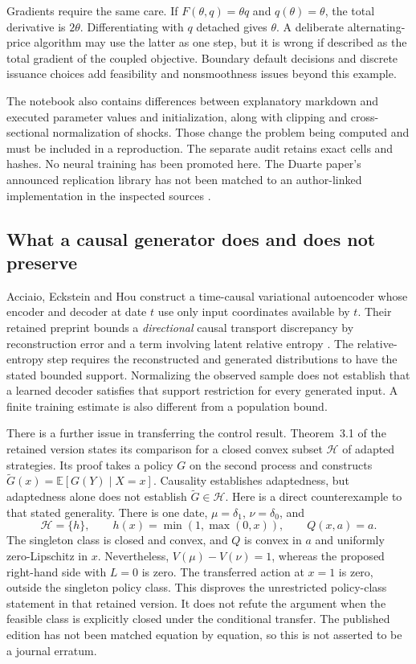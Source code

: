 \documentclass[11pt,a4paper]{article}
\newcommand{\E}{\mathbb E}
\begin{document}
Gradients require the same care. If $F(\theta,q)=\theta q$ and
$q(\theta)=\theta$, the total derivative is $2\theta$. Differentiating
with $q$ detached gives $\theta$. A deliberate alternating-price algorithm
may use the latter as one step, but it is wrong if described as the total
gradient of the coupled objective. Boundary default decisions and discrete
issuance choices add feasibility and nonsmoothness issues beyond this example.

The notebook also contains differences between explanatory markdown and
executed parameter values and initialization, along with clipping and
cross-sectional normalization of shocks. Those change the problem being
computed and must be included in a reproduction. The separate audit retains
exact cells and hashes. No neural training has been promoted here. The
Duarte paper's announced replication library has not been matched to an
author-linked implementation in the inspected sources \cite{duarte}.


\subsection{What a causal generator does and does not preserve}
Acciaio, Eckstein and Hou construct a time-causal variational autoencoder whose
encoder and decoder at date $t$ use only input coordinates available by $t$.
Their retained preprint bounds a \emph{directional} causal transport discrepancy
by reconstruction error and a term involving latent relative entropy
\cite[Lemma~2.4, Theorem~2.5 and Corollary~2.6]{tcvae}. The relative-entropy
step requires the reconstructed and generated distributions to have the stated
bounded support. Normalizing the observed sample does not establish that a
learned decoder satisfies that support restriction for every generated input.
A finite training estimate is also different from a population bound.

There is a further issue in transferring the control result. Theorem~3.1 of
the retained version states its comparison for a closed convex subset
$\mathcal H$ of adapted strategies. Its proof takes a policy $G$ on the second
process and constructs $\widetilde G(x)=\E[G(Y)\mid X=x]$. Causality establishes
adaptedness, but adaptedness alone does not establish
$\widetilde G\in\mathcal H$. Here is a direct counterexample to that stated
generality. There is one date, $\mu=\delta_1$, $\nu=\delta_0$, and
\begin{equation}
\mathcal H=\{h\},\qquad h(x)=\min(1,\max(0,x)),\qquad Q(x,a)=a.
\end{equation}
The singleton class is closed and convex, and $Q$ is convex in $a$ and
uniformly zero-Lipschitz in $x$. Nevertheless,
$V(\mu)-V(\nu)=1$, whereas the proposed right-hand side with $L=0$ is zero.
The transferred action at $x=1$ is zero, outside the singleton policy class.
This disproves the unrestricted policy-class statement in that retained
version. It does not refute the argument when the feasible class is explicitly
closed under the conditional transfer. The published edition has not been
matched equation by equation, so this is not asserted to be a journal erratum.
\end{document}
